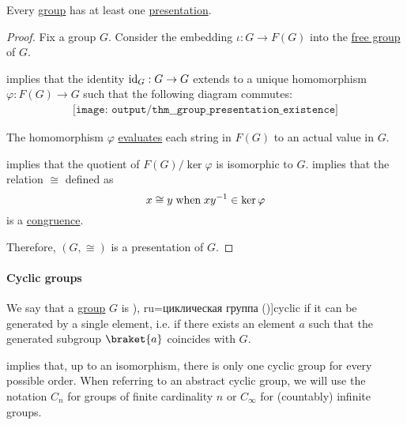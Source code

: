 \begin{proposition}\label{thm:group_presentation_existence}
  Every \hyperref[def:group]{group} has at least one \hyperref[def:group_presentation]{presentation}.
\end{proposition}
\begin{proof}
  Fix a group \( G \). Consider the embedding \( \iota: G \to F(G) \) into the \hyperref[def:free_group]{free group} of \( G \).

   implies that the identity \( {\operatorname{id}_G: G \to G} \) extends to a unique homomorphism \( \varphi: F(G) \to G \) such that the following diagram commutes:
  \begin{equation*}
    \begin{aligned}
      \texttt{[image: output/thm\_\_group\_presentation\_existence]}
    \end{aligned}
  \end{equation*}

  The homomorphism \( \varphi \) \hyperref[con:evaluation_homomorphism]{evaluates} each string in \( F(G) \) to an actual value in \( G \).

   implies that the quotient of \( F(G) / \ker \varphi \) is isomorphic to \( G \).  implies that the relation \( {\cong} \) defined as
  \begin{equation*}
    x \cong y \T{when} xy^{-1} \in \ker \varphi
  \end{equation*}
  is a \hyperref[def:first_order_congruence]{congruence}.

  Therefore, \( (G, \cong) \) is a presentation of \( G \).
\end{proof}

\paragraph{Cyclic groups}

\begin{definition}\label{def:cyclic_group}
  We say that a \hyperref[def:group]{group} \( G \) is \term[ru=циклична группа (\cite[379]{Обрешков1962ВисшаАлгебра}), ru=циклическая группа (\cite[97]{Тыртышников2017ОсновыАлгебры})]{cyclic} if it can be generated by a single element, i.e. if there exists an element \( a \) such that the generated subgroup \( \braket{ a } \) coincides with \( G \).

   implies that, up to an isomorphism, there is only one cyclic group for every possible order. When referring to an abstract cyclic group, we will use the notation \( C_n \) for groups of finite cardinality \( n \) or \( C_\infty \) for (countably) infinite groups.
\end{definition}

